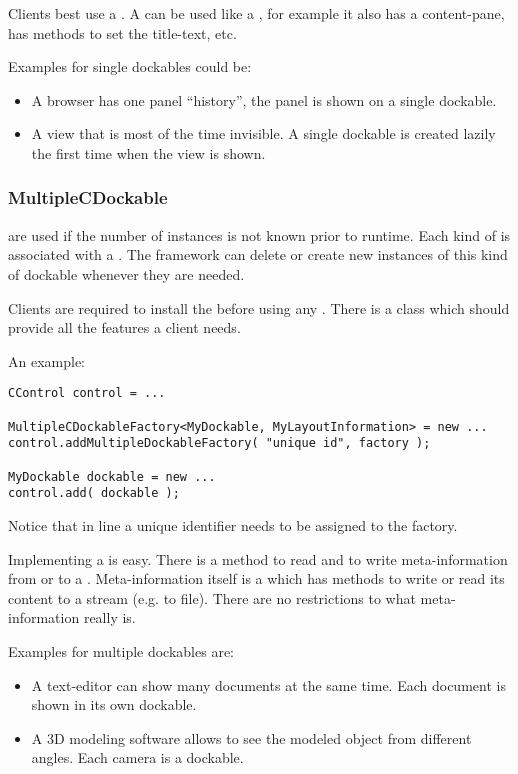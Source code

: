 Clients best use a . A  can be used like a , for example it also has a content-pane, has methods to set the title-text, etc.

Examples for single dockables could be:
\begin{itemize}
  \item A browser has one panel ``history'', the panel is shown on a single dockable.
  \item A view that is most of the time invisible. A single dockable is created lazily the first time when the view is shown.
\end{itemize}

\subsubsection{MultipleCDockable}
 are used if the number of instances is not known prior to runtime. Each kind of  is associated with a \linebreak {}. The framework can delete or create new instances of this kind of dockable whenever they are needed.

Clients are required to install the  before using any . There is a class  which should provide all the features a client needs.

An example:
\begin{lstlisting}
CControl control = ...

MultipleCDockableFactory<MyDockable, MyLayoutInformation> = new ...
control.addMultipleDockableFactory( "unique id", factory );

MyDockable dockable = new ...
control.add( dockable );
\end{lstlisting}
Notice that in line  a unique identifier needs to be assigned to the factory.

Implementing a  is easy. There is a method to read and to write meta-information from or to a . Meta-information itself is a  which has methods to write or read its content to a stream (e.g. to file). There are no restrictions to what meta-information really is.

Examples for multiple dockables are:
\begin{itemize}
 \item A text-editor can show many documents at the same time. Each document is shown in its own dockable.
 \item A 3D modeling software allows to see the modeled object from different angles. Each camera is a dockable.
\end{itemize}

